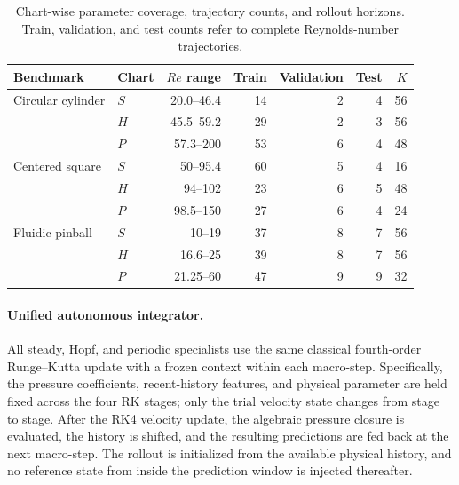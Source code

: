 \begin{table}[h]
\centering
\caption{Chart-wise parameter coverage, trajectory counts, and rollout horizons. Train, validation, and test counts refer to complete Reynolds-number trajectories.}
\label{tab:chart_splits}
\small
\setlength{\tabcolsep}{4pt}
\begin{tabular}{llrrrrr}
\toprule
Benchmark & Chart & $Re$ range & Train & Validation & Test & $K$ \\
\midrule
Circular cylinder & $S$ & 20.0--46.4 & 14 & 2 & 4 & 56 \\
                  & $H$ & 45.5--59.2 & 29 & 2 & 3 & 56 \\
                  & $P$ & 57.3--200  & 53 & 6 & 4 & 48 \\
\addlinespace
Centered square   & $S$ & 50--95.4   & 60 & 5 & 4 & 16 \\
                  & $H$ & 94--102    & 23 & 6 & 5 & 48 \\
                  & $P$ & 98.5--150  & 27 & 6 & 4 & 24 \\
\addlinespace
Fluidic pinball   & $S$ & 10--19     & 37 & 8 & 7 & 56 \\
                  & $H$ & 16.6--25   & 39 & 8 & 7 & 56 \\
                  & $P$ & 21.25--60  & 47 & 9 & 9 & 32 \\
\bottomrule
\end{tabular}
\end{table}

\paragraph{Unified autonomous integrator.}
All steady, Hopf, and periodic specialists use the same classical fourth-order Runge--Kutta update with a frozen context within each macro-step. Specifically, the pressure coefficients, recent-history features, and physical parameter are held fixed across the four RK stages; only the trial velocity state changes from stage to stage. After the RK4 velocity update, the algebraic pressure closure is evaluated, the history is shifted, and the resulting predictions are fed back at the next macro-step. The rollout is initialized from the available physical history, and no reference state from inside the prediction window is injected thereafter.

